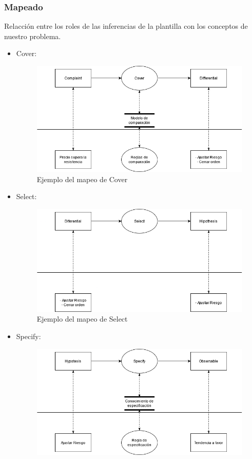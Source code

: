 \subsubsection{Mapeado}
Relacción entre los roles de las inferencias de la plantilla con los conceptos de nuestro problema.
\begin{itemize}
  \item Cover:  
  \begin{figure}[H]
    \centering
    \includegraphics[scale=0.50]{imagenes/Cover.png}
    \caption{\label{fig:Cover}Ejemplo del mapeo de Cover}
  \end{figure}
  \item Select: 
  \begin{figure}[H]
    \centering
    \includegraphics[scale=0.50]{imagenes/Select.png}
    \caption{\label{fig:Select}Ejemplo del mapeo de Select}
  \end{figure}
  \newpage
  \item Specify: 
  \begin{figure}[H]
    \centering
    \includegraphics[scale=0.50]{imagenes/Specify.png}

\end{figure}
\end{itemize}
